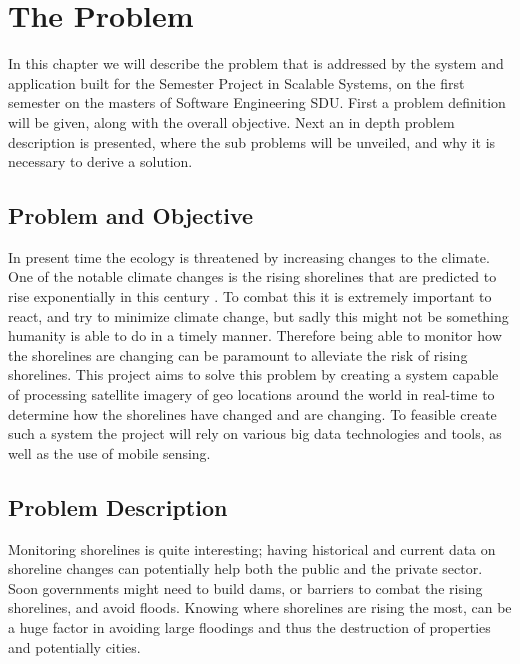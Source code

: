 \chapter{The Problem}

In this chapter we will describe the problem that is addressed by the system and application built for the Semester Project in Scalable Systems, on the first semester on the masters of Software Engineering SDU. \medbreak
\noindent
First a problem definition will be given, along with the overall objective. Next an in depth problem description is presented, where the sub problems will be unveiled, and why it is necessary to derive a solution.

\section{Problem and Objective}

In present time the ecology is threatened by increasing changes to the climate. One of the notable climate changes is the rising shorelines that are predicted to rise exponentially in this century . To combat this it is extremely important to react, and try to minimize climate change, but sadly this might not be something humanity is able to do in a timely manner. Therefore being able to monitor how the shorelines are changing can be paramount to alleviate the risk of rising shorelines. \medbreak 
\noindent
This project aims to solve this problem by creating a system capable of processing satellite imagery of geo locations around the world in real-time to determine how the shorelines have changed and are changing. \medbreak 
\noindent
To feasible create such a system the project will rely on various big data technologies and tools, as well as the use of mobile sensing.

\section{Problem Description}

Monitoring shorelines is quite interesting; having historical and current data on shoreline changes can potentially help both the public and the private sector.  \medbreak 
\noindent
Soon governments might need to build dams, or barriers to combat the rising shorelines, and avoid floods. Knowing where shorelines are rising the most, can be a huge factor in avoiding large floodings and thus the destruction of properties and potentially cities.

